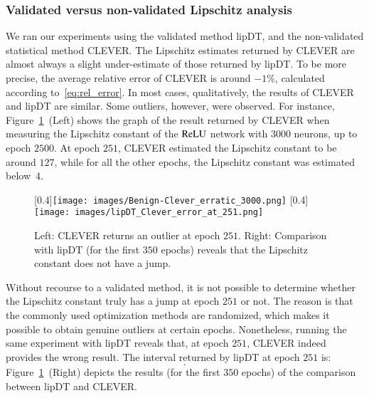 \documentclass[11pt,times]{article}
\begin{document}

\subsubsection{Validated versus non-validated Lipschitz analysis}




We ran our experiments using the validated method lipDT, and the
non-validated statistical method \ac{CLEVER}. The Lipschitz estimates
returned by \ac{CLEVER} are almost always a slight under-estimate of
those returned by lipDT. To be more precise, the average relative
error of \ac{CLEVER} is around $-1\%$, calculated according
to~\eqref{eq:rel_error}. In most cases, qualitatively, the results of
\ac{CLEVER} and lipDT are similar. Some outliers, however, were
observed. For instance,
Figure~\ref{fig:benign_clever_wrong_3000}~(Left) shows the graph of
the result returned by \ac{CLEVER} when measuring the Lipschitz
constant of the $\operatorname{\mathrm{ReLU}}$ network with $3000$ neurons, up to epoch
$2500$. At epoch $251$, \ac{CLEVER} estimated the Lipschitz constant
to be around $127$, while for all the other epochs, the Lipschitz
constant was estimated below~$4$.


\begin{figure}[t]
  \centering
  \scalebox{0.45}[0.4]{\texttt{[image: images/Benign-Clever\_erratic\_3000.png]}}
  \scalebox{0.45}[0.4]{\texttt{[image: images/lipDT\_Clever\_error\_at\_251.png]}}
  \caption{Left: \ac{CLEVER} returns an outlier at epoch $251$. Right:
    Comparison with lipDT (for the first $350$ epochs) reveals that
    the Lipschitz constant does not have a jump.}
  \label{fig:benign_clever_wrong_3000}
\end{figure}


Without recourse to a validated method, it is not possible to
determine whether the Lipschitz constant truly has a jump at epoch
$251$ or not. The reason is that the commonly used optimization
methods are randomized, which makes it possible to obtain genuine
outliers at certain epochs. Nonetheless, running the same experiment
with lipDT reveals that, at epoch $251$, \ac{CLEVER} indeed provides
the wrong result. The interval returned by lipDT at epoch $251$ is:
%
\begin{equation*}
[2.445572934050687,2.445572934050933].   
\end{equation*}
%
Figure~\ref{fig:benign_clever_wrong_3000}~(Right)
depicts the results (for the first $350$ epochs) of the comparison
between lipDT and \ac{CLEVER}.
\end{document}
